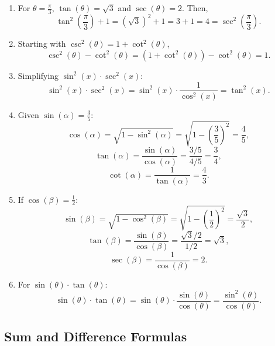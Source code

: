 \documentclass[a4paper,12pt]{book}
\begin{document}
\begin{enumerate}
    \item For $\theta = \frac{\pi}{3}$, $\tan(\theta) = \sqrt{3}$ and $\sec(\theta) = 2$. Then,
    \[
    \tan^2\left(\frac{\pi}{3}\right) + 1 = (\sqrt{3})^2 + 1 = 3 + 1 = 4 = \sec^2\left(\frac{\pi}{3}\right).
    \]

    \item Starting with $\csc^2(\theta) = 1 + \cot^2(\theta)$,
    \[
    \csc^2(\theta) - \cot^2(\theta) = (1 + \cot^2(\theta)) - \cot^2(\theta) = 1.
    \]

    \item Simplifying $\sin^2(x) \cdot \sec^2(x)$:
    \[
    \sin^2(x) \cdot \sec^2(x) = \sin^2(x) \cdot \frac{1}{\cos^2(x)} = \tan^2(x).
    \]

    \item Given $\sin(\alpha) = \frac{3}{5}$:
    \[
    \cos(\alpha) = \sqrt{1 - \sin^2(\alpha)} = \sqrt{1 - \left(\frac{3}{5}\right)^2} = \frac{4}{5},
    \]
    \[
    \tan(\alpha) = \frac{\sin(\alpha)}{\cos(\alpha)} = \frac{3/5}{4/5} = \frac{3}{4},
    \]
    \[
    \cot(\alpha) = \frac{1}{\tan(\alpha)} = \frac{4}{3}.
    \]

    \item If $\cos(\beta) = \frac{1}{2}$:
    \[
    \sin(\beta) = \sqrt{1 - \cos^2(\beta)} = \sqrt{1 - \left(\frac{1}{2}\right)^2} = \frac{\sqrt{3}}{2},
    \]
    \[
    \tan(\beta) = \frac{\sin(\beta)}{\cos(\beta)} = \frac{\sqrt{3}/2}{1/2} = \sqrt{3},
    \]
    \[
    \sec(\beta) = \frac{1}{\cos(\beta)} = 2.
    \]

    \item For $\sin(\theta) \cdot \tan(\theta)$:
    \[
    \sin(\theta) \cdot \tan(\theta) = \sin(\theta) \cdot \frac{\sin(\theta)}{\cos(\theta)} = \frac{\sin^2(\theta)}{\cos(\theta)}.
    \]
\end{enumerate}




\subsection{Sum and Difference Formulas}
\label{subsec:sum_difference_formulas}
\end{document}
